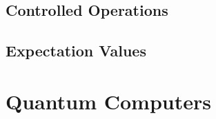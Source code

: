 \subsection{Controlled Operations}\label{sec:ControlledOperations}


\subsection{Expectation Values}\label{sec:ExpectationValues}




\section{Quantum Computers}\label{sec:QuantumCircuits}



